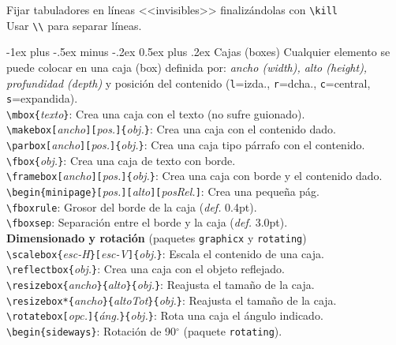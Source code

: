 \documentclass[10pt,landscape,a4paper]{article}
\makeatletter
\renewcommand{\section}{\@startsection{section}{1}{0mm}%
                                {-1ex plus -.5ex minus -.2ex}%
                                {0.5ex plus .2ex}%
                                {\normalfont\large\bfseries}}
\makeatother
\begin{document}
\begin{multicols}{3}
Fijar tabuladores en líneas <<invisibles>> finalizándolas con \verb!\kill!\\
Usar \verb!\\! para separar líneas.






\section{Cajas (boxes)}
 Cualquier elemento se puede colocar en una caja (box) definida por: \emph{ancho (width), alto (height), profundidad (depth)} y posición del contenido (\texttt{l}=izda., \texttt{r}=dcha., \texttt{c}=central, \texttt{s}=expandida).\\[0.7mm]
 
\verb!\mbox{!\emph{texto}\verb!}!: Crea una caja con el texto (no sufre guionado).\\
\verb!\makebox[!\emph{ancho}\verb!][!\emph{pos.}\verb!]{!\emph{obj.}\verb!}!: Crea una caja con el contenido dado.\\
\verb!\parbox[!\emph{ancho}\verb!][!\emph{pos.}\verb!]{!\emph{obj.}\verb!}!: Crea una caja tipo párrafo con el contenido.\\
\verb!\fbox{!\emph{obj.}\verb!}!: Crea una caja de texto con borde.\\
\verb!\framebox[!\emph{ancho}\verb!][!\emph{pos.}\verb!]{!\emph{obj.}\verb!}!: Crea una caja con borde y el contenido dado.\\
\verb!\begin{minipage}[!\emph{pos.}\verb!][!\emph{alto}\verb!][!\emph{posRel.}\verb!]!: Crea una pequeña pág.\\
\verb!\fboxrule!: Grosor del borde de la caja (\emph{def.} 0.4pt).\\
\verb!\fboxsep!: Separación entre el borde y la caja (\emph{def.} 3.0pt).\\[0.7mm]




\textbf{Dimensionado y rotación} {\small (paquetes \texttt{graphicx} y \texttt{rotating})}\\
\verb!\scalebox{!\emph{esc-H}\verb!}[!\emph{esc-V}\verb!]{!\emph{obj.}\verb!}!: Escala el contenido de una caja.\\
\verb!\reflectbox{!\emph{obj.}\verb!}!: Crea una caja con el objeto reflejado.\\
\verb!\resizebox{!\emph{ancho}\verb!}{!\emph{alto}\verb!}{!\emph{obj.}\verb!}!: Reajusta el tamaño de la caja.\\
\verb!\resizebox*{!\emph{ancho}\verb!}{!\emph{altoTot}\verb!}{!\emph{obj.}\verb!}!: Reajusta el tamaño de la caja.\\
\verb!\rotatebox[!\emph{opc.}\verb!]{!\emph{áng.}\verb!}{!\emph{obj.}\verb!}!: Rota una caja el ángulo indicado.\\
\verb!\begin{sideways}!: Rotación de 90$^\circ$ (paquete \texttt{rotating}).\\






\end{multicols}
\end{document}
